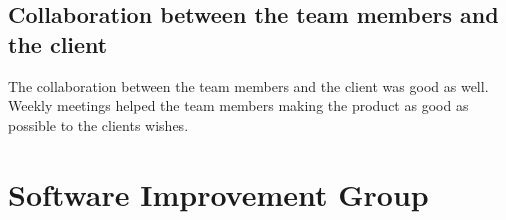 \subsection{Collaboration between the team members and the client}
The collaboration between the team members and the client was good as well. 
Weekly meetings helped the team members making the product as good as possible to the clients wishes. 

\section{Software Improvement Group}